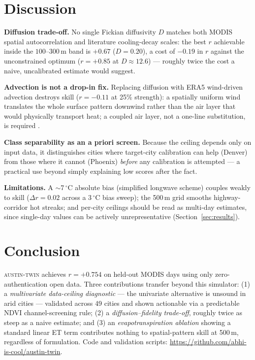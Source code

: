 \documentclass[conference]{IEEEtran}
\begin{document}
\section{Discussion}
\label{sec:disc}

\textbf{Diffusion trade-off.} No single Fickian diffusivity $D$ matches
both MODIS spatial autocorrelation and literature cooling-decay scales:
the best $r$ achievable inside the $100$--$300$\,m band is $+0.67$
($D{=}0.20$), a cost of $-0.19$ in $r$ against the unconstrained optimum
($r{=}{+}0.85$ at $D{\approx}12.6$) --- roughly twice the cost a naive,
uncalibrated estimate would suggest.

\textbf{Advection is not a drop-in fix.} Replacing diffusion with
ERA5 wind-driven advection destroys skill ($r{=}{-}0.11$ at 25\%
strength): a spatially uniform wind translates the whole surface pattern
downwind rather than the air layer that would physically transport heat;
a coupled air layer, not a one-line substitution, is required
\cite{mitraka2025prototypes}.

\textbf{Class separability as an a priori screen.} Because the ceiling
depends only on input data, it distinguishes cities where target-city
calibration can help (Denver) from those where it cannot (Phoenix)
\emph{before} any calibration is attempted --- a practical use beyond
simply explaining low scores after the fact.

\textbf{Limitations.} A $\sim$7\,$^{\circ}$C absolute bias (simplified longwave
scheme) couples weakly to skill ($\Delta r{=}0.02$ across a 3\,$^{\circ}$C bias
sweep); the 500\,m grid smooths highway-corridor hot streaks; and
per-city ceilings should be read as multi-day estimates, since single-day
values can be actively unrepresentative (Section~\ref{sec:results}).

\section{Conclusion}
\textsc{austin-twin} achieves $r{=}{+}0.754$ on held-out MODIS days using
only zero-authentication open data. Three contributions transfer beyond
this simulator: (1) a \emph{multivariate data-ceiling diagnostic} --- the
univariate alternative is unsound in arid cities --- validated across 49
cities and shown actionable via a predictable NDVI channel-screening
rule; (2) a \emph{diffusion--fidelity trade-off}, roughly twice as steep
as a naive estimate; and (3) an \emph{evapotranspiration ablation}
showing a standard linear ET term contributes nothing to spatial-pattern
skill at 500\,m, regardless of formulation. Code and validation scripts:
\url{https://github.com/abhi-is-cool/austin-twin}.
\end{document}
